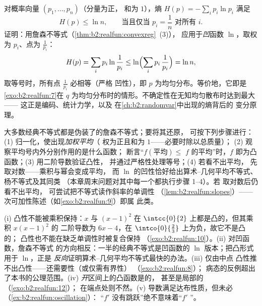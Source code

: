 \begin{example}[最大熵]\label{ex:b2:realfun:entropy}
对概率向量 $(p_1, \dots, p_n)$（分量为正，
和为 $1$），熵 $H(p) = -\sum_i p_i\ln p_i$
满足
\[
H(p) \leq \ln n ,
\qquad\text{当且仅当 } p_i = \frac1n \text{ 对所有 }
i .
\]
证明：用詹森不等式（\cref{thm:b2:realfun:convexreg}~(3)），
应用于\emph{凹}函数 $\ln$，取权为 $p_i$、点为
$\frac{1}{p_i}$：
\[
H(p) = \sum_i p_i\ln\frac{1}{p_i}
\leq \ln\Bigl(\sum_i p_i\,\frac1{p_i}\Bigr) = \ln n ,
\]
取等号时，所有点 $\frac1{p_i}$ 必相等（严格
凹性），即 $p$ 为均匀分布。等价地，它即是
\cref{exo:b2:realfun:7}在 $q$ 为均匀分布时的情形。不确定性在无知均匀散布时达到最大——
这正是编码、统计力学，以及
在\cref{ch:b2:randomvar}中出现的熵背后的
变分原理。
\end{example}

\begin{method}[求隐藏在不等式背后的凸函数]\label{met:b2:realfun:spotting}
大多数经典不等式都是伪装了的詹森不等式；要将其还原，
可按下列步骤进行：(1) 归一化，使出现\emph{加权平均}（
权为正且和为 $1$——必要时除以总质量）；
(2) 观察平均号内外分别作用的是什么函数；
断言“$f(\text{平均}) \leq$
$f$ 的平均”时，$f$ 即为凸函数；(3) 用二阶导数验证凸性，
并通过严格性处理等号；(4) 若看不出平均，
先取对数——乘积与幂会变成平均，
而 $\ln$ 的凹性恰好给出算术–几何平均不等式、杨不等式及其同类
（本章周末问题对其中每一个都执行步骤 1--4）。若
取对数后仍看不出平均，
可尝试把不等式读作斜率的单调性
（\cref{lem:b2:realfun:slopes}）——
次可加性陈述（如\cref{exo:b2:realfun:9}）即属
此类。
\end{method}

\begin{remark}[常见误区]\label{rem:b2:realfun:pitfalls}
(i) 凸性不能被乘积保持：$x$ 与 $(x - 1)^2$
在 $\intcc{0}{2}$ 上都是凸的，但其乘积 $x(x-1)^2$ 的
二阶导数为 $6x - 4$，在
$\intco{0}{\frac23}$ 上为负，故它不是凸的；
凸性也不能在缺乏单调性时被复合保持
（\cref{exo:b2:realfun:10}）。(ii) 对凹函数，詹森不等式
的方向相反：一半的经典不等式是凹函数的
$\ln$ 版本；把凸形式用于 $\ln$，正是
\emph{反向}证明算术–几何平均不等式最快的办法。(iii) 仅由中点
凸性推不出凸性——还需要性（或仅需有界性）
（\cref{exo:b2:realfun:8}）；
病态的反例超出了本书的公理范围。(iv)
\emph{开}区间上的凸函数是的，
甚至是局部的（\cref{exo:b2:realfun:12}）；
在端点处则不然。(v) 导数满足达布性质，但未必
（\cref{ex:b2:realfun:oscillation}）：
“$f'$ 没有跳跃”绝不意味着“$f'$ ”。
\end{remark}

